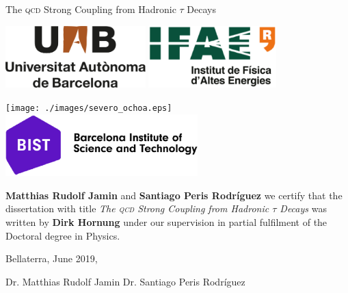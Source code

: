 \documentclass[12pt,a4paper,openright]{scrreprt}
\makeatletter
\numberwithin{equation}{section}       %
\let\org@subfile
\renewcommand*{}[1]{%
  \filename@parse{#1}%
  \expandafter
  \graphicspath\expandafter{\expandafter{\filename@area}}%
  \org@subfile{#1}%
}
\makeatother
\begin{document}
\begin{center}
  \Large
  The \textsc{qcd} Strong Coupling from Hadronic \(\tau\) Decays

  \makebox[\linewidth]{\rule{\textwidth}{1pt}}

  \vspace{2cm}

  \includegraphics[height=2.4cm]{./images/logo_UAB.eps} \hfill
  \includegraphics[height=2.4cm]{./images/logo_IFAE.eps}

  \vspace{1cm}

  \texttt{[image: ./images/severo\_ochoa.eps]} \hfill
  \includegraphics[height=2.4cm]{./images/bist.eps}

  \vspace{3cm}
\end{center}

\large
\textbf{Matthias Rudolf Jamin} and \textbf{Santiago Peris Rodríguez} we
certify that the dissertation with title \textit{The \textsc{qcd} Strong Coupling from
Hadronic \(\tau\) Decays} was written by \textbf{Dirk Hornung} under our
supervision in partial fulfilment of the Doctoral degree in Physics.

\vfill
Bellaterra, June 2019, \par
\vspace{0.2cm}
Dr. Matthias Rudolf Jamin \hfill Dr. Santiago Peris Rodríguez
\vspace{1cm}
\normalsize


  



\setcounter{tocdepth}{1}
\tableofcontents

\newpage
{}





  \appendix
  
  \printbibliography[heading=bibintoc]
  \printnomenclature
\end{document}
